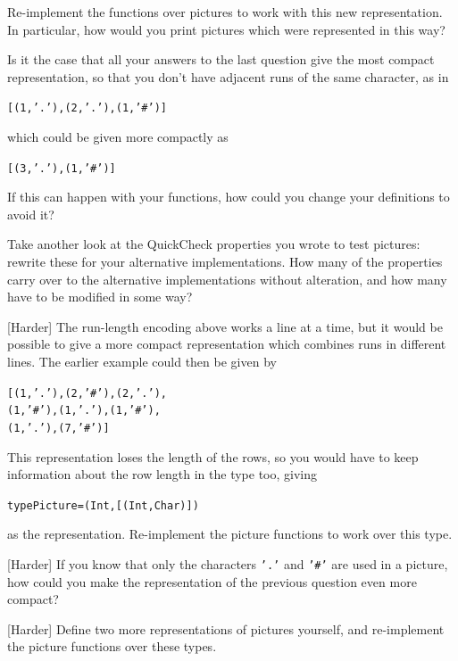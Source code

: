 \begin{exercises}

\item
Re-implement the functions over pictures to work with this new representation. In particular, how would you print pictures which were represented in this way?

\item
Is it the case that all your answers to the last question give the most compact representation, so that you don't have adjacent runs of the same character, as in 
\begin{alltt}
[(1,'.'), (2,'.'), (1,'#')]
\end{alltt}
which could be given more compactly as
\begin{alltt}
[(3,'.'), (1,'#')]
\end{alltt}
If this can happen with your functions, how could you change your definitions to avoid it?

\item
Take another look at the QuickCheck properties you wrote to test pictures: rewrite these for your alternative implementations. How many of the properties carry over to the alternative implementations without alteration, and how many have to be modified in some way?

\item {[Harder]}
The run-length encoding above works a line at a time, but it would be possible to give a more compact representation which combines runs in different lines. The earlier example could then be given by 
\begin{alltt}
[(1,'.'), (2,'#'), (2,'.'),
 (1,'#'), (1,'.'), (1,'#'),
 (1,'.'), (7,'#')]
\end{alltt}
This representation loses the length of the rows, so you would have to keep information about the row length in the type too, giving
\begin{alltt}
type Picture = (Int, [(Int,Char)] )
\end{alltt}
as the representation. Re-implement the picture functions to work over this type.

\item {[Harder]}
If you know that only the characters \texttt{'.'} and \texttt{'\#'} are used in a picture, how could you make the representation of the previous question even more compact?

\item {[Harder]}
Define two more representations of pictures yourself, and re-implement the picture functions over these types.



\end{exercises}

